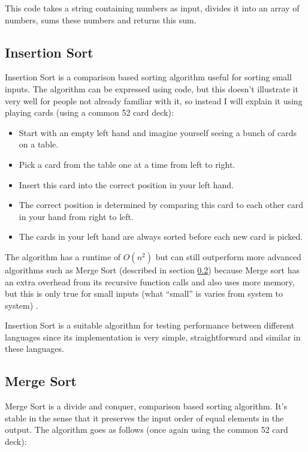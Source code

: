 This code takes a string containing numbers as input, divides it into an array of numbers, sums these numbers and returns this sum.

\subsection{Insertion Sort}
Insertion Sort is a comparison based sorting algorithm useful for sorting small inputs. The algorithm can be expressed using code, but this doesn't illustrate it very well for people not already familiar with it, so instead I will explain it using playing cards (using a common 52 card deck):

\begin{itemize}
\item Start with an empty left hand and imagine yourself seeing a bunch of cards on a table.
\item Pick a card from the table one at a time from left to right.
\item Insert this card into the correct position in your left hand.
\item The correct position is determined by comparing this card to each other card in your hand from right to left.
\item The cards in your left hand are always sorted before each new card is picked.
\end{itemize} 

The algorithm has a runtime of $O(n^2)$ but can still outperform more advanced algorithms such as Merge Sort (described in section \ref{subsec:merge_sort}) because Merge sort has an extra overhead from its recursive function calls and also uses more memory, but this is only true for small inputs (what ``small'' is varies from system to system) \cite{Insertionsort}.

Insertion Sort is a suitable algorithm for testing performance between different languages since its implementation is very simple, straightforward and similar in these languages.


\subsection{Merge Sort} \label{subsec:merge_sort}
Merge Sort is a divide and conquer, comparison based sorting algorithm. It's stable in the sense that it preserves the input order of equal elements in the output. The algorithm goes as follows (once again using the common 52 card deck):

